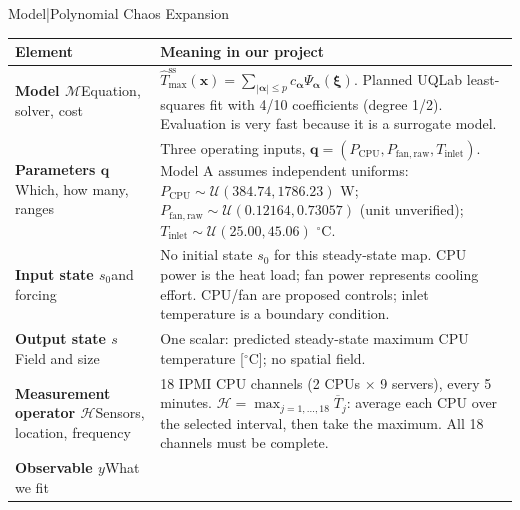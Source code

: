 \begin{frame}{Model\enspace|\enspace Polynomial Chaos Expansion}
  {\fontsize{7}{8.2}\selectfont
  \renewcommand{\arraystretch}{1.0}
  \setlength{\aboverulesep}{0.8pt}
  \setlength{\belowrulesep}{0.8pt}
  \begin{tabular}{@{}p{}p{}@{}}
    \toprule
    \textbf{Element} & \textbf{Meaning in our project}\\
    \midrule
    \textbf{Model $\mathcal{M}$}\newline Equation, solver, cost &
      $\widehat{T}_{\max}^{\mathrm{ss}}(\mathbf{x})
      =\sum_{|\boldsymbol{\alpha}|\leq p}c_{\boldsymbol{\alpha}}
      \Psi_{\boldsymbol{\alpha}}(\boldsymbol{\xi})$.
      Planned UQLab least-squares fit with 4/10 coefficients (degree 1/2).
      Evaluation is very fast because it is a surrogate model.\\
    \midrule
    \textbf{Parameters $\mathbf{q}$}\newline Which, how many, ranges &
      Three operating inputs, $\mathbf{q}=(P_{\mathrm{CPU}},P_{\mathrm{fan,raw}},T_{\mathrm{inlet}})$.
      Model A assumes independent uniforms:
      $P_{\mathrm{CPU}}\sim\mathcal{U}(384.74,1786.23)$ W;
      $P_{\mathrm{fan,raw}}\sim\mathcal{U}(0.12164,0.73057)$ (unit unverified);
      $T_{\mathrm{inlet}}\sim\mathcal{U}(25.00,45.06)$ ${}^\circ$C.\\
    \midrule
    \textbf{Input state $s_0$}\newline and forcing &
      No initial state $s_0$ for this steady-state map.
      CPU power is the heat load; fan power represents cooling effort.
      CPU/fan are proposed controls; inlet temperature is a boundary condition.\\
    \midrule
    \textbf{Output state $s$}\newline Field and size &
      One scalar: predicted steady-state maximum CPU temperature [${}^\circ$C];
      no spatial field.\\
    \midrule
    \textbf{Measurement operator $\mathcal{H}$}\newline Sensors, location, frequency &
      18 IPMI CPU channels (2 CPUs $\times$ 9 servers), every 5 minutes.
      $\mathcal{H}=\max_{j=1,\ldots,18}\overline{T}_j$:
      average each CPU over the selected interval, then take the maximum.
      All 18 channels must be complete.\\
    \midrule
    \textbf{Observable $y$}\newline What we fit &

\end{tabular}}
\end{frame}
